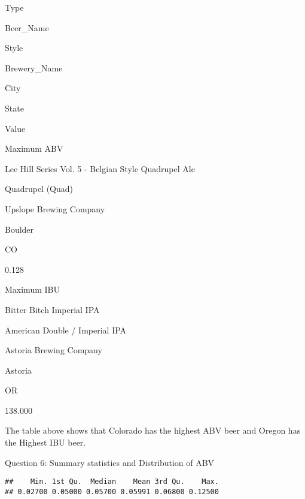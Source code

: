 \documentclass[
]{article}
\newenvironment{Shaded}{\begin{snugshade}}{\end{snugshade}}
\newcommand{\FunctionTok}[1]{\textcolor[rgb]{0.00,0.00,0.00}{#1}}
\newcommand{\NormalTok}[1]{#1}
\newcommand{\SpecialCharTok}[1]{\textcolor[rgb]{0.00,0.00,0.00}{#1}}
\begin{document}
Type

Beer\_Name

Style

Brewery\_Name

City

State

Value

Maximum ABV

Lee Hill Series Vol. 5 - Belgian Style Quadrupel Ale

Quadrupel (Quad)

Upslope Brewing Company

Boulder

CO

0.128

Maximum IBU

Bitter Bitch Imperial IPA

American Double / Imperial IPA

Astoria Brewing Company

Astoria

OR

138.000

The table above shows that Colorado has the highest ABV beer and Oregon
has the Highest IBU beer.

Question 6: Summary statistics and Distribution of ABV

\begin{Shaded}
\end{Shaded}

\begin{verbatim}
##    Min. 1st Qu.  Median    Mean 3rd Qu.    Max. 
## 0.02700 0.05000 0.05700 0.05991 0.06800 0.12500
\end{verbatim}
\end{document}
